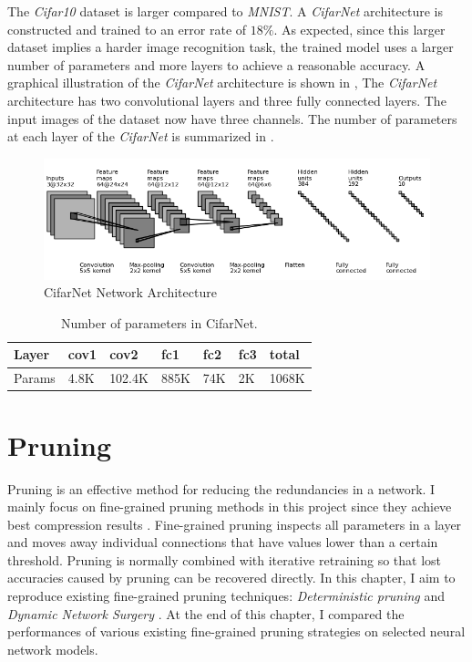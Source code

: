 \documentclass[a4paper,12pt]{report}
\begin{document}
The \textit{Cifar10} dataset is larger compared to \textit{MNIST}.
A \textit{CifarNet} architecture is constructed and trained to an error rate of $18\%$.
As expected, since this larger dataset implies a harder image recognition task,
the trained model uses a larger number of parameters and more layers
to achieve a reasonable accuracy.
A graphical illustration of the \textit{CifarNet} architecture is shown in ,
The \textit{CifarNet} architecture has two convolutional layers and three fully connected
layers.
The input images of the dataset now have three channels.
The number of parameters at each layer of the \textit{CifarNet} is summarized
in .

\begin{figure}[!h]
  \includegraphics[width=\textwidth]{fig_cifarnet.png}
  \caption{CifarNet Network Architecture}
  \label{fig:Cifarnetparam}
\end{figure}

\begin{table}[!h]
\centering
\begin{tabular}{|l|l|l|l|l|l|l|}
\hline
Layer			&cov1	&cov2	&fc1	&fc2	&fc3 		&total\\ \hline
Params		& 4.8K		&102.4K	&885K	&74K	&2K &1068K\\
\hline
\end{tabular}
\caption{\label{tab:CifarNetparam}Number of parameters in CifarNet.}
\end{table}

\chapter{Pruning}
\label{sec:dprune}
Pruning is an effective method for reducing the redundancies in a network.
I mainly focus on fine-grained pruning methods in this project since they achieve best
compression results \cite{mao2017exploring}.
Fine-grained pruning inspects all parameters in a layer and moves away individual connections that have values
lower than a certain threshold.
Pruning is normally combined with iterative retraining so that lost accuracies caused by pruning can
be recovered directly.
In this chapter, I aim to reproduce existing fine-grained pruning techniques:
\textit{Deterministic pruning} \cite{Han} and \textit{Dynamic Network Surgery} \cite{Guo}.
At the end of this chapter, I compared the performances of various
existing fine-grained pruning strategies on selected neural network models.
\end{document}
